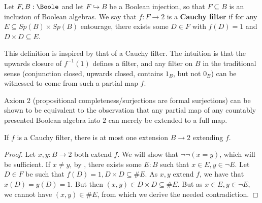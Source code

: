 \begin{definition}
  Let $F,B : \Boole$ and let $F \hookrightarrow B$ be a Boolean injection, so that $F\subseteq B$ is an inclusion of Boolean algebras. 
  We say that $f:F \to 2$ is a \textbf{Cauchy filter} if for any $E\subseteq Sp(B) \times Sp(B)$ entourage, there exists some $D\in F$ with $f(D) = 1$ and $D \times D \subseteq E$. 
\end{definition}
This definition is inspired by that of a Cauchy filter. The intuition is that the upwards closure of $f^{-1}(1)$ defines a filter, and any filter on $B$ in the traditional sense (conjunction closed, upwards closed, contains $1_B$, but not $0_B$) can be witnessed to come from such a partial map $f$. 

\begin{remark}
  Axiom 2 (propositional completeness/surjections are formal surjections) can be shown to be equivalent to the observation that any partial map of any countably presented Boolean algebra into $2$ can merely be extended to a full map. 
\end{remark}

\begin{lemma}
  If $f$ is a Cauchy filter, there is at most one extension $B \to 2$ extending $f$. 
\end{lemma}
\begin{proof}
  Let $x,y: B \to 2$ both extend $f$. We will show that $\neg \neg (x = y)$, which will be sufficient. 
  If $x \neq y$, by \parencite{synthetic-stone-duality, TODO}, there exists some $E:B$ such that $x \in E, y \in \neg E$. 
  Let $D \in F$ be such that $f(D) = 1 , D \times D \subseteq \#E$.
  As $x,y$ extend $f$, we have that $x(D) = y(D) = 1$. But then $(x,y) \in D \times D\subseteq \#E$. 
  But as $x\in E, y \in \neg E$, we cannot have $(x,y) \in \#E$, from which we derive the needed contradiction. 
\end{proof}
